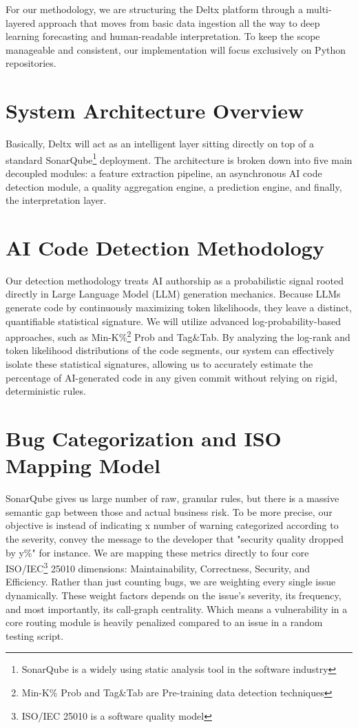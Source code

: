 For our methodology, we are structuring the Deltx platform through a multi-layered approach that moves from basic data ingestion all the way to deep learning forecasting and human-readable interpretation. To keep the scope manageable and consistent, our implementation will focus exclusively on Python repositories.

\section{System Architecture Overview}

Basically, Deltx will act as an intelligent layer sitting directly on top of a standard SonarQube\footnote{SonarQube is a widely using static analysis tool in the software industry} deployment. The architecture is broken down into five main decoupled modules: a feature extraction pipeline, an asynchronous AI code detection module, a quality aggregation engine, a prediction engine, and finally, the interpretation layer.

\section{AI Code Detection Methodology}

Our detection methodology treats AI authorship as a probabilistic signal rooted directly in Large Language Model (LLM) generation mechanics. Because LLMs generate code by continuously maximizing token likelihoods, they leave a distinct, quantifiable statistical signature. We will utilize advanced log-probability-based approaches, such as Min-K\%\footnote{Min-K\% Prob and Tag\&Tab are Pre-training data detection techniques} Prob and Tag\&Tab. By analyzing the log-rank and token likelihood distributions of the code segments, our system can effectively isolate these statistical signatures, allowing us to accurately estimate the percentage of AI-generated code in any given commit without relying on rigid, deterministic rules.

\section{Bug Categorization and ISO Mapping Model}

SonarQube gives us large number of raw, granular rules, but there is a massive semantic gap between those and actual business risk. To be more precise, our objective is instead of indicating x number of warning categorized according to the severity, convey the message to the developer that "security quality dropped by y\%" for instance. We are mapping these metrics directly to four core ISO/IEC\footnote{ISO/IEC 25010 is a software quality model} 25010 dimensions: Maintainability, Correctness, Security, and Efficiency. Rather than just counting bugs, we are weighting every single issue dynamically. These weight factors depends on the issue's severity, its frequency, and most importantly, its call-graph centrality. Which means a vulnerability in a core routing module is heavily penalized compared to an issue in a random testing script.

